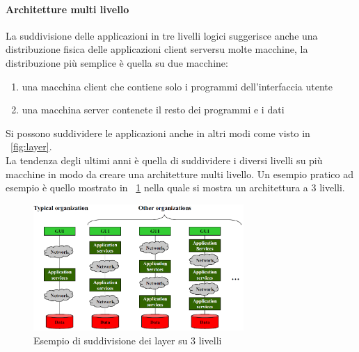 \paragraph{Architetture multi livello}
La suddivisione delle applicazioni in tre livelli logici suggerisce anche una distribuzione fisica delle applicazioni client serversu molte macchine, la distribuzione più semplice è quella su due macchine:
\begin{enumerate}
\item una macchina client che contiene solo i programmi dell'interfaccia utente
\item una macchina server contenete il resto dei programmi e i dati
\end{enumerate}
Si possono suddividere le applicazioni anche in altri modi come visto in \figurename~\ref{fig:layer}.\\
La tendenza degli ultimi anni è quella di suddividere i diversi livelli su più macchine in modo da creare una architetture multi livello.
Un esempio pratico ad esempio è quello mostrato in \figurename~\ref{fig:3layer} nella quale si mostra un architettura a 3 livelli.\\
\begin{figure}[htb]
\centering
\includegraphics[width=8cm]{img/3layer.png}
\caption{Esempio di suddivisione dei layer su 3 livelli}\label{fig:3layer}
\end{figure}
